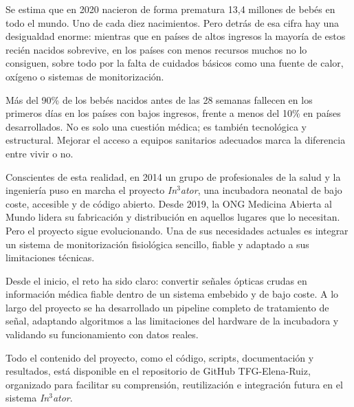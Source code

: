 

Se estima que en 2020 nacieron de forma prematura 13,4 millones de bebés en todo el mundo. Uno de cada diez nacimientos. Pero detrás de esa cifra hay una desigualdad enorme: mientras que en países de altos ingresos la mayoría de estos recién nacidos sobrevive, en los países con menos recursos muchos no lo consiguen, sobre todo por la falta de cuidados básicos como una fuente de calor, oxígeno o sistemas de monitorización.

Más del 90\% de los bebés nacidos antes de las 28 semanas fallecen en los primeros días en los países con bajos ingresos, frente a menos del 10\% en países desarrollados. No es solo una cuestión médica; es también tecnológica y estructural. Mejorar el acceso a equipos sanitarios adecuados marca la diferencia entre vivir o no.

Conscientes de esta realidad, en 2014 un grupo de profesionales de la salud y la ingeniería puso en marcha el proyecto \textit{In$^3$ator}, una incubadora neonatal de bajo coste, accesible y de código abierto. Desde 2019, la ONG Medicina Abierta al Mundo lidera su fabricación y distribución en aquellos lugares que lo necesitan. Pero el proyecto sigue evolucionando. Una de sus necesidades actuales es integrar un sistema de monitorización fisiológica sencillo, fiable y adaptado a sus limitaciones técnicas.

Desde el inicio, el reto ha sido claro: convertir señales ópticas crudas en información médica fiable dentro de un sistema embebido y de bajo coste. A lo largo del proyecto se ha desarrollado un pipeline completo de tratamiento de señal, adaptando algoritmos a las limitaciones del hardware de la incubadora y validando su funcionamiento con datos reales.

Todo el contenido del proyecto, como el código, scripts, documentación y resultados, está disponible en el repositorio de GitHub TFG-Elena-Ruiz, organizado para facilitar su comprensión, reutilización e integración futura en el sistema \textit{In$^3$ator}.







